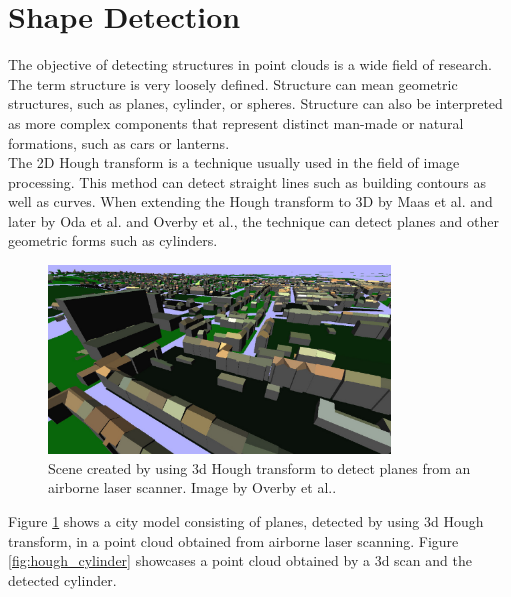 \section {Shape Detection}
\label{sec:related_work_shape detection}

The objective of detecting structures in point clouds is a wide field of research. The term structure is very loosely defined. Structure can mean geometric structures, such as planes, cylinder, or spheres. Structure can also be interpreted as more complex components that represent distinct man-made or natural formations, such as cars or lanterns. 
\\
The 2D Hough transform\cite{hough1962method} is a technique usually used in the field of image processing. This method can detect straight lines such as building contours as well as curves. When extending the Hough transform to 3D by Maas et al.\cite{maas1999two} and later by Oda et al.\cite{oda2004automatic} and Overby et al.\cite{overby2004automatic}, the technique can detect planes and other geometric forms such as cylinders\cite{rabbani2005efficient}. 

\begin{figure}
    \centering
    \includegraphics[width=0.81\textwidth]{Related_Work/hough_planes.png}%
    \caption{Scene created by using 3d Hough transform to detect planes from an airborne laser scanner. Image by Overby et al.\cite{overby2004automatic}.}
    \label{fig:hough_planes}
\end{figure}

Figure \ref{fig:hough_planes} shows a city model consisting of planes, detected by using 3d Hough transform, in a point cloud obtained from airborne laser scanning. Figure \ref{fig:hough_cylinder} showcases a point cloud obtained by a 3d scan and the detected cylinder. 

